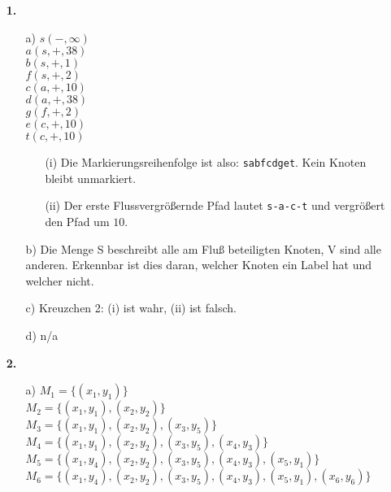 \documentclass[a4paper,11pt]{article}
\author{\authorinfo}
\title{\titleinfo}
\date{\today}
\begin{document}
\maketitle
\begin{enumerate}
\item[\textbf{1.}]
    \begin{enumerate}
    \item[a)]
        \( s(-, \infty) \)\\
        \( a(s, +, 38) \)\\
        \( b(s, +, 1) \)\\
        \( f(s, +, 2) \)\\
        \( c(a, +, 10) \)\\
        \( d(a, +, 38) \)\\
        \( g(f, +, 2) \)\\
        \( e(c, +, 10) \)\\
        \( t(c, +, 10) \)

        \begin{enumerate}
            \item[(i)]
                Die Markierungsreihenfolge ist also: \texttt{sabfcdget}. Kein Knoten
                bleibt unmarkiert.
            \item[(ii)]
                Der erste Flussvergrößernde Pfad lautet \texttt{s-a-c-t} und
                vergrößert den Pfad um $10$.
        \end{enumerate}

    \item[b)]
        Die Menge S beschreibt alle am Fluß beteiligten Knoten, V sind alle anderen.
        Erkennbar ist dies daran, welcher Knoten ein Label hat und welcher nicht.

    \item[c)]
        Kreuzchen 2: (i) ist wahr, (ii) ist falsch.

    \item[d)]
        n/a

    \end{enumerate}

\item[\textbf{2.}]
    \begin{enumerate}
    \item[a)]
        \( M_1 = \{ (x_1, y_1) \} \) \\
        \( M_2 = \{ (x_1, y_1), (x_2, y_2) \} \) \\
        \( M_3 = \{ (x_1, y_1), (x_2, y_2), (x_3, y_5) \} \) \\
        \( M_4 = \{ (x_1, y_1), (x_2, y_2), (x_3, y_5), (x_4, y_3) \} \) \\
        \( M_5 = \{ (x_1, y_4), (x_2, y_2), (x_3, y_5), (x_4, y_3), (x_5, y_1) \} \) \\
        \( M_6 = \{ (x_1, y_4), (x_2, y_2), (x_3, y_5), (x_4, y_3), (x_5, y_1), (x_6, y_6) \} \)


\end{enumerate}
\end{enumerate}
\end{document}
